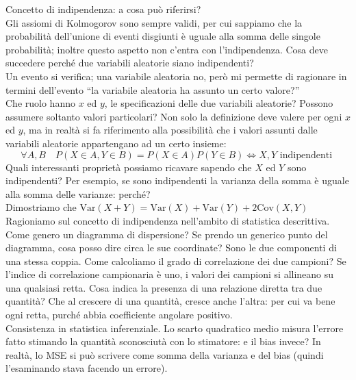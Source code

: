 \documentclass{article}
\begin{document}
    Concetto di indipendenza: a cosa può riferirsi? \\
    Gli assiomi di Kolmogorov sono sempre validi, per cui sappiamo che la probabilità dell'unione di eventi disgiunti è uguale alla somma delle singole probabilità; inoltre
    questo aspetto non c'entra con l'indipendenza. Cosa deve succedere perché due variabili aleatorie siano indipendenti? \\
    Un evento si verifica; una variabile aleatoria no, però mi permette di ragionare in termini dell'evento “la variabile aleatoria ha assunto un certo valore?” \\
    Che ruolo hanno $ x $ ed $ y $, le specificazioni delle due variabili aleatorie? Possono assumere soltanto valori particolari? Non solo la definizione deve valere per ogni
    $ x $ ed $ y $, ma in realtà si fa riferimento alla possibilità che i valori assunti dalle variabili aleatorie appartengano ad un certo insieme:
    \[
        \forall A, B \quad P ( X \in A, Y \in B ) = P ( X \in A ) P ( Y \in B ) \iff X, Y \text{ indipendenti }
    \]
    Quali interessanti proprietà possiamo ricavare sapendo che $ X $ ed $ Y $ sono indipendenti? Per esempio, se sono indipendenti la varianza della somma è uguale alla somma
    delle varianze: perché? \\
    Dimostriamo che $ \text{Var} (X + Y) = \text{Var} (X) + \text{Var} (Y) + 2 \text{Cov} (X, Y) $ \\
    Ragioniamo sul concetto di indipendenza nell'ambito di statistica descrittiva. Come genero un diagramma di dispersione? Se prendo un generico punto del diagramma, cosa posso
    dire circa le sue coordinate? Sono le due componenti di una stessa coppia. Come calcoliamo il grado di correlazione dei due campioni? Se l'indice di correlazione campionaria
    è uno, i valori dei campioni si allineano su una qualsiasi retta. Cosa indica la presenza di una relazione diretta tra due quantità? Che al crescere di una quantità, cresce
    anche l'altra: per cui va bene ogni retta, purché abbia coefficiente angolare positivo. \\
    Consistenza in statistica inferenziale. Lo scarto quadratico medio misura l'errore fatto stimando la quantità sconosciutà con lo stimatore: e il bias invece? In realtà, lo
    MSE si può scrivere come somma della varianza e del bias (quindi l'esaminando stava facendo un errore).
    
\end{document}
